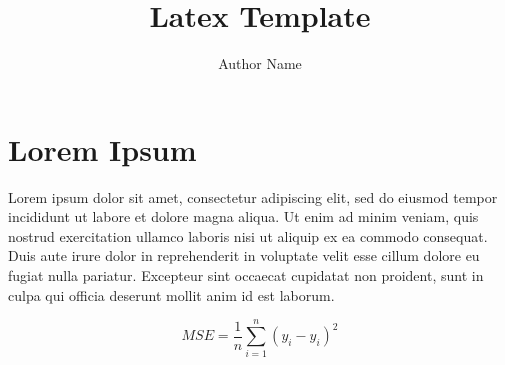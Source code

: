\documentclass{article}
\title{Latex Template}
\author{
    Author Name
}
\begin{document}
\twocolumn
\maketitle

\section{Lorem Ipsum}

Lorem ipsum dolor sit amet, consectetur adipiscing elit, sed do eiusmod tempor incididunt ut labore et dolore magna aliqua. Ut enim ad minim veniam, quis nostrud exercitation ullamco laboris nisi ut aliquip ex ea commodo consequat. Duis aute irure dolor in reprehenderit in voluptate velit esse cillum dolore eu fugiat nulla pariatur. Excepteur sint occaecat cupidatat non proident, sunt in culpa qui officia deserunt mollit anim id est laborum\cite{book_example}.

\begin{equation}
    \label{equ:pagerank}
    MSE = \frac{1}{n}\sum_{i=1}^n{(y_i - \hat{y}_i)^2}
\end{equation}

\onecolumn

\nocite{*}


\end{document}
